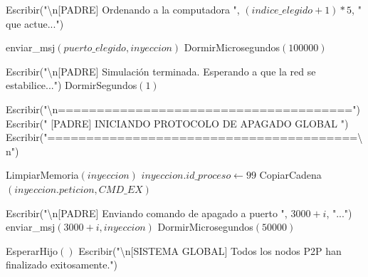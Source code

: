 \begin{tcolorbox}[colback=white, colframe=azul_unam, title=Pseudocódigo: sinc\_vectoriales.c (P2P), breakable]
\begin{algorithmic}[1]
        \State Escribir("\textbackslash n[PADRE] Ordenando a la computadora ", $(indice\_elegido + 1) * 5$, " que actue...")
        
        \State enviar\_msj$(puerto\_elegido, inyeccion)$
        \State DormirMicrosegundos$(100000)$
        
    \EndFor

    \State Escribir("\textbackslash n[PADRE] Simulación terminada. Esperando a que la red se estabilice...")
    \State DormirSegundos$(1)$
    
    \State Escribir("\textbackslash n======================================")
    \State Escribir(" [PADRE] INICIANDO PROTOCOLO DE APAGADO GLOBAL ")
    \State Escribir("========================================\textbackslash n")

        
        \State LimpiarMemoria$(inyeccion)$
        \State $inyeccion.id\_proceso \gets 99$
        \State CopiarCadena$(inyeccion.peticion, CMD\_EX)$
         
        \State Escribir("\textbackslash n[PADRE] Enviando comando de apagado a puerto ", $3000 + i$, "...")
        \State enviar\_msj$(3000 + i, inyeccion)$
        \State DormirMicrosegundos$(50000)$
        
    \EndFor

    \State EsperarHijo$()$
    \State Escribir("\textbackslash n[SISTEMA GLOBAL] Todos los nodos P2P han finalizado exitosamente.")

\EndIf

\State {}

\EndProcedure

\end{algorithmic}
\end{tcolorbox}

